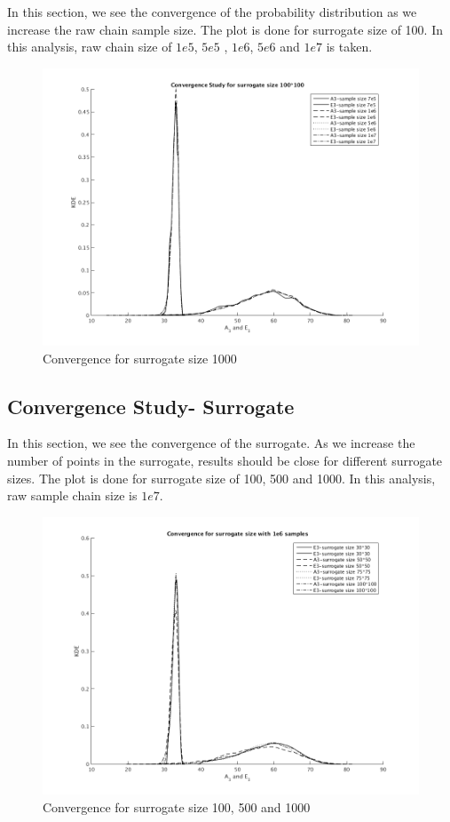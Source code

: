  In this section, we see the convergence of the probability distribution as we increase the raw chain sample size. The plot is done for surrogate size of 100. In this analysis, raw chain size of $1e5$, $5e5$ , $1e6$, $5e6$ and $1e7$ is taken. 

\begin{figure}[H]
\centering
\includegraphics[scale = 0.7]{model_3/sample_conv} 
    \caption{Convergence for surrogate size 1000}
\end{figure}


\subsection{Convergence Study- Surrogate }

 In this section, we see the convergence of the surrogate. As we increase the number of points in the surrogate, results should be close for different surrogate sizes. The plot is done for surrogate size of 100, 500 and 1000. In this analysis, raw sample chain size is $1e7$. 

\begin{figure}[H]
\centering
\includegraphics[scale=0.7]{model_3/surrogate_conv} 
    \caption{Convergence for surrogate size 100, 500 and 1000}
\end{figure}



